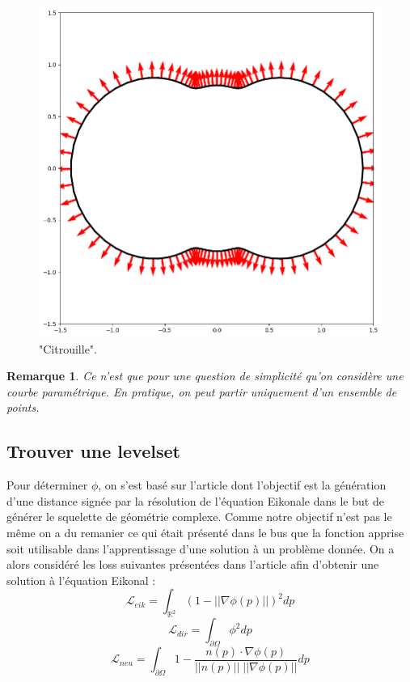\documentclass[french]{article}
\newtheorem*{Rem}{Remarque}
\begin{document}
	\begin{minipage}{0.33\linewidth}
		\begin{figure}[H]
			\centering
			\includegraphics[width=\linewidth]{"levelset/pumpkin/curve_pumpkin.png"}
			\caption{"Citrouille".}
		\end{figure}
	\end{minipage}

	\begin{Rem}
		Ce n'est que pour une question de simplicité qu'on considère une courbe paramétrique. En pratique, on peut partir uniquement d'un ensemble de points.
	\end{Rem}

	\subsection{Trouver une levelset}
	
	Pour déterminer $\phi$, on s'est basé sur l'article \cite{CLEMOT2023368} dont l'objectif est la génération d'une distance signée par la résolution de l'équation Eikonale dans le but de générer le squelette de géométrie complexe. Comme notre objectif n'est pas le même on a du remanier ce qui était présenté dans le bus que la fonction apprise soit utilisable dans l'apprentissage d'une solution à un problème donnée. On a alors considéré les loss suivantes présentées dans l'article afin d'obtenir une solution à l'équation Eikonal :
	\begin{equation*}
		\mathcal{L}_{eik}=\int_{\mathbb{R}^2} \left(1-||\nabla \phi(p)||\right)^2 dp
	\end{equation*}
	\begin{equation*}
		\mathcal{L}_{dir}=\int_{\partial\Omega} \phi^2 dp
	\end{equation*}
	\begin{equation*}
		\mathcal{L}_{neu}=\int_{\partial\Omega} 1-\frac{n(p)\cdot\nabla\phi(p)}{||n(p)||\;||\nabla\phi(p)||} dp
	\end{equation*}
\end{document}
